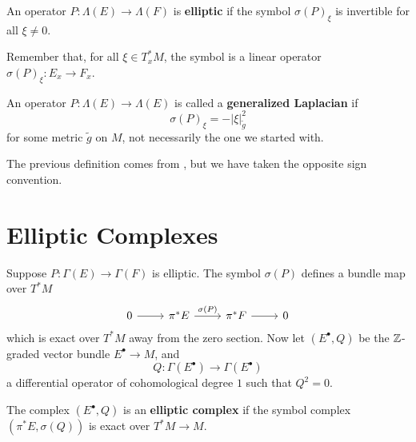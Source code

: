 \begin{definition}
  An operator $P \colon \Lambda (E) \to \Lambda(F)$ is \textbf{elliptic} if the symbol $\sigma(P)_\xi$ is invertible for all $\xi \neq 0$.
\end{definition}
Remember that, for all $\xi \in T_x^*M$, the symbol is a linear operator $\sigma(P)_\xi \colon E_x \to F_x$.

\begin{definition}
  An operator $P : \Lambda(E) \to \Lambda(E)$ is called a \textbf{generalized Laplacian} if
  \begin{equation*}
    \sigma(P)_\xi = - |\xi|_{\tilde{g}}^2
  \end{equation*}
  for some metric $\tilde{g}$ on $M$, not necessarily the one we started with.
\end{definition}
The previous definition comes from \cite{BGVHeat96}, but we have taken the opposite sign convention.

\section{Elliptic Complexes}

Suppose $P \colon \Gamma(E) \to \Gamma(F)$ is elliptic. The symbol $\sigma(P)$ defines a bundle map over $T^*M$
\begin{equation*}
  \begin{tikzcd}
    0 \arrow[r] &
    \pi^* E \arrow[r, "\sigma(P)"] &
    \pi^* F \arrow[r] & 0
  \end{tikzcd}
\end{equation*}
which is exact over $T^*M$ away from the zero section.
Now let $(E^\bullet, Q)$ be the $\mathbb{Z}$-graded vector bundle $E^\bullet \to M$, and
\begin{equation*}
  Q \colon \Gamma(E^\bullet) \longrightarrow \Gamma(E^\bullet)
\end{equation*}
a differential operator of cohomological degree $1$ such that $Q^2 = 0$.

\begin{definition}
  The complex $(E^\bullet, Q)$ is an \textbf{elliptic complex} if the symbol complex $(\pi^* E, \sigma(Q))$ is exact over $T^*M \to M$.
\end{definition}

